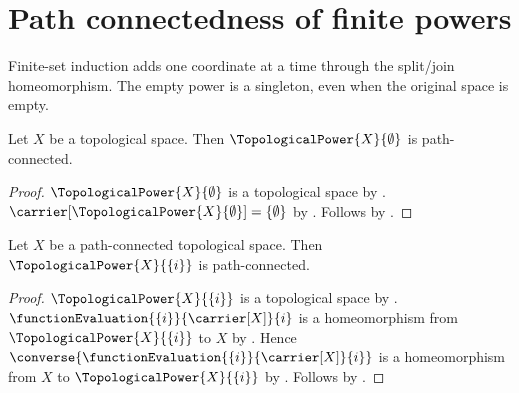 \section{Path connectedness of finite powers}




Finite-set induction adds one coordinate at a time through the split/join
homeomorphism. The empty power is a singleton, even when the original space
is empty.

\begin{theorem}\label{empty_topological_power_is_path_connected}
    Let $X$ be a topological space.
    Then $\TopologicalPower{X}{\emptyset}$ is path-connected.
\end{theorem}
\begin{proof}
    $\TopologicalPower{X}{\emptyset}$ is a topological space by
        .
    $\carrier[\TopologicalPower{X}{\emptyset}]=\{\emptyset\}$ by
        .
    Follows by .
\end{proof}

\begin{theorem}\label{singleton_topological_power_is_path_connected}
    Let $X$ be a path-connected topological space.
    Then $\TopologicalPower{X}{\{i\}}$ is path-connected.
\end{theorem}
\begin{proof}
    $\TopologicalPower{X}{\{i\}}$ is a topological space by
        .
    $\functionEvaluation{\{i\}}{\carrier[X]}{i}$ is a homeomorphism from
        $\TopologicalPower{X}{\{i\}}$ to $X$ by .
    Hence $\converse{\functionEvaluation{\{i\}}{\carrier[X]}{i}}$ is a homeomorphism
        from $X$ to $\TopologicalPower{X}{\{i\}}$ by .
    Follows by .
\end{proof}

